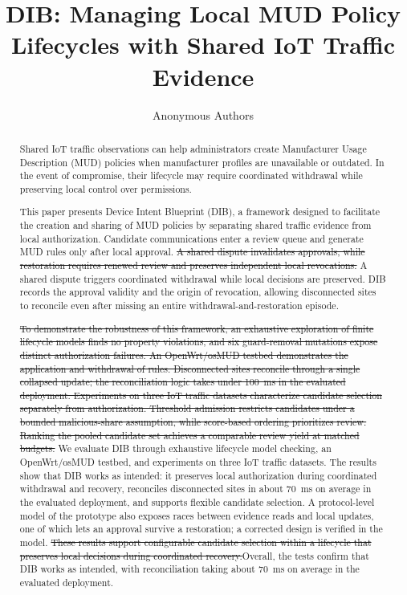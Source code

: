 \documentclass[journal]{IEEEtran}
\theoremstyle{definition}
\newcommand{\del}[1]{{\color{blue}\sout{#1}}}  %
\newcommand{\add}[1]{{\color{red}#1}}          %
\begin{document}
\title{DIB: Managing Local MUD Policy Lifecycles with Shared IoT Traffic Evidence}
\author{Anonymous Authors}
\maketitle

\begin{abstract}
Shared IoT traffic observations can help administrators create Manufacturer Usage Description (MUD) policies when manufacturer profiles are unavailable or outdated.
In the event of compromise, their lifecycle may require coordinated withdrawal while preserving local control over permissions.

This paper presents Device Intent Blueprint (DIB), a framework designed to facilitate the creation and sharing of MUD policies by separating shared traffic evidence from local authorization. Candidate communications enter a review queue and generate MUD rules only after local approval. \del{A shared dispute invalidates approvals, while restoration requires renewed review and preserves independent local revocations.} \add{A shared dispute triggers coordinated withdrawal while local decisions are preserved.} DIB records the approval validity and the origin of revocation, allowing disconnected sites to reconcile even after missing an entire withdrawal-and-restoration episode.

\del{To demonstrate the robustness of this framework, an exhaustive exploration of finite lifecycle models finds no property violations, and six guard-removal mutations expose distinct authorization failures. An OpenWrt/osMUD testbed demonstrates the application and withdrawal of rules. Disconnected sites reconcile through a single collapsed update; the reconciliation logic takes under 100~ms in the evaluated deployment. Experiments on three IoT traffic datasets characterize candidate selection separately from authorization. Threshold admission restricts candidates under a bounded malicious-share assumption, while score-based ordering prioritizes review. Ranking the pooled candidate set achieves a comparable review yield at matched budgets.} \add{We evaluate DIB through exhaustive lifecycle model checking, an OpenWrt/osMUD testbed, and experiments on three IoT traffic datasets. The results show that DIB works as intended: it preserves local authorization during coordinated withdrawal and recovery, reconciles disconnected sites in about 70~ms on average in the evaluated deployment, and supports flexible candidate selection.} \add{A protocol-level model of the prototype also exposes races between evidence reads and local updates, one of which lets an approval survive a restoration; a corrected design is verified in the model.} \del{These results support configurable candidate selection within a lifecycle that preserves local decisions during coordinated recovery.}\add{Overall, the tests confirm that DIB works as intended, with reconciliation taking about 70~ms on average in the evaluated deployment.}
\end{abstract}
\end{document}
